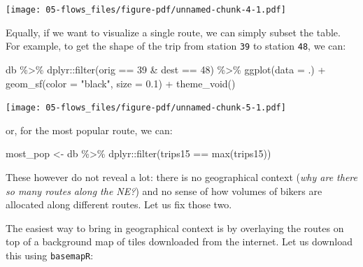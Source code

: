 \documentclass[
  letterpaper,
  DIV=11,
  numbers=noendperiod,
  oneside]{scrreprt}
\newenvironment{Shaded}{\begin{snugshade}}{\end{snugshade}}
\newcommand{\AttributeTok}[1]{\textcolor[rgb]{0.40,0.45,0.13}{#1}}
\newcommand{\DecValTok}[1]{\textcolor[rgb]{0.68,0.00,0.00}{#1}}
\newcommand{\FloatTok}[1]{\textcolor[rgb]{0.68,0.00,0.00}{#1}}
\newcommand{\FunctionTok}[1]{\textcolor[rgb]{0.28,0.35,0.67}{#1}}
\newcommand{\NormalTok}[1]{\textcolor[rgb]{0.00,0.23,0.31}{#1}}
\newcommand{\OtherTok}[1]{\textcolor[rgb]{0.00,0.23,0.31}{#1}}
\newcommand{\SpecialCharTok}[1]{\textcolor[rgb]{0.37,0.37,0.37}{#1}}
\newcommand{\StringTok}[1]{\textcolor[rgb]{0.13,0.47,0.30}{#1}}
\begin{document}
\begin{Shaded}
\end{Shaded}

\texttt{[image: 05-flows\_files/figure-pdf/unnamed-chunk-4-1.pdf]}

Equally, if we want to visualize a single route, we can simply subset
the table. For example, to get the shape of the trip from station
\texttt{39} to station \texttt{48}, we can:

\begin{Shaded}
\begin{Highlighting}[]
\NormalTok{db }\SpecialCharTok{\%\textgreater{}\%} 
\NormalTok{  dplyr}\SpecialCharTok{::}\FunctionTok{filter}\NormalTok{(orig }\SpecialCharTok{==} \DecValTok{39} \SpecialCharTok{\&}\NormalTok{ dest }\SpecialCharTok{==} \DecValTok{48}\NormalTok{) }\SpecialCharTok{\%\textgreater{}\%} 
  \FunctionTok{ggplot}\NormalTok{(}\AttributeTok{data =}\NormalTok{ .) }\SpecialCharTok{+} 
  \FunctionTok{geom\_sf}\NormalTok{(}\AttributeTok{color =} \StringTok{"black"}\NormalTok{, }
          \AttributeTok{size =} \FloatTok{0.1}\NormalTok{) }\SpecialCharTok{+}
  \FunctionTok{theme\_void}\NormalTok{()}
\end{Highlighting}
\end{Shaded}

\texttt{[image: 05-flows\_files/figure-pdf/unnamed-chunk-5-1.pdf]}

or, for the most popular route, we can:

\begin{Shaded}
\begin{Highlighting}[]
\NormalTok{most\_pop }\OtherTok{\textless{}{-}}\NormalTok{ db }\SpecialCharTok{\%\textgreater{}\%} 
\NormalTok{  dplyr}\SpecialCharTok{::}\FunctionTok{filter}\NormalTok{(trips15 }\SpecialCharTok{==} \FunctionTok{max}\NormalTok{(trips15))}
\end{Highlighting}
\end{Shaded}

These however do not reveal a lot: there is no geographical context
(\emph{why are there so many routes along the NE?}) and no sense of how
volumes of bikers are allocated along different routes. Let us fix those
two.

The easiest way to bring in geographical context is by overlaying the
routes on top of a background map of tiles downloaded from the internet.
Let us download this using \texttt{basemapR}:
\end{document}
